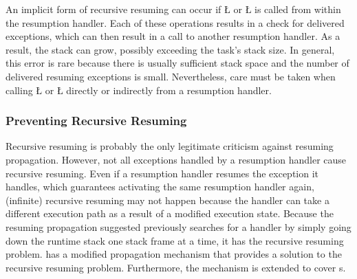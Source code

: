 \documentclass[openright,twoside]{report}
\begin{document}
\begin{annotation}
An implicit form of recursive resuming can occur if \LGinlinetrue\LGbegin\lgrinde\L{}\endlgrinde\LGend{} or \LGinlinetrue\LGbegin\lgrinde\L{}\endlgrinde\LGend{} is called from within the resumption handler.
Each of these operations results in a check for delivered exceptions, which can then result in a call to another resumption handler.
As a result, the stack can grow, possibly exceeding the task's stack size.
In general, this error is rare because there is usually sufficient stack space and the number of delivered resuming exceptions is small.
Nevertheless, care must be taken when calling \LGinlinetrue\LGbegin\lgrinde\L{}\endlgrinde\LGend{} or \LGinlinetrue\LGbegin\lgrinde\L{}\endlgrinde\LGend{} directly or indirectly from a resumption handler.
\end{annotation}


\subsubsection{Preventing Recursive Resuming}

Recursive resuming is probably the only legitimate criticism against resuming propagation.
However, not all exceptions handled by a resumption handler cause recursive resuming.
Even if a resumption handler resumes the exception it handles, which guarantees activating the same resumption handler again, (infinite) recursive resuming may not happen because the handler can take a different execution path as a result of a modified execution state.
Because the resuming propagation suggested previously searches for a handler by simply going down the runtime stack one stack frame at a time, it has the recursive resuming problem.
\uC has a modified propagation mechanism that provides a solution to the recursive resuming problem.
Furthermore, the mechanism is extended to cover s.
\end{document}
